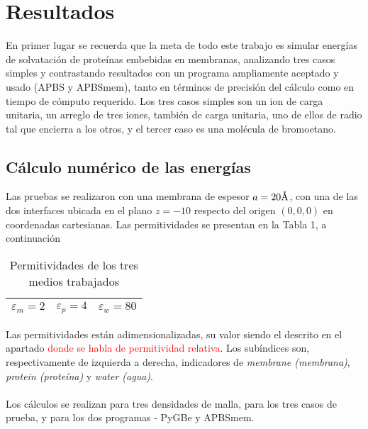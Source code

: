 \documentclass[12pt, oneside, numbers, spanish]{ezthesis}
\numberwithin{equation}{section}
\newcommand{\angstrom}{\text{\normalfont\AA}}
\begin{document}
%














\chapter{Resultados}
En primer lugar se recuerda que la meta de todo este trabajo es simular energías de solvatación de proteínas embebidas en membranas, analizando tres casos simples y contrastando resultados con un programa ampliamente aceptado y usado (APBS y APBSmem), tanto en términos de precisión del cálculo como en tiempo de cómputo requerido. Los tres casos simples son un ion de carga unitaria, un arreglo de tres iones, también de carga unitaria, uno de ellos de radio tal que encierra a los otros, y el tercer caso es una molécula de bromoetano.
\section{Cálculo numérico de las energías}
Las pruebas se realizaron con una membrana de espesor $a = 20 \angstrom$, con una de las dos interfaces ubicada en el plano $z=-10$ respecto del origen $(0,0,0)$ en coordenadas cartesianas. Las permitividades se presentan en la Tabla 1, a continuación
\begin{table}[H]
\setlength{\tabcolsep}{32pt}
\centering
\caption{Permitividades de los tres medios trabajados}
\begin{tabular}{ccc}\hline
$\varepsilon_m = 2$ & $\varepsilon_p = 4$ & $\varepsilon_w = 80$\\\hline
\end{tabular}
\end{table}
Las permitividades están adimensionalizadas, su valor siendo el descrito en el apartado \textcolor{red}{donde se habla de permitividad relativa}. Los subíndices son, respectivamente de izquierda a derecha, indicadores de \textit{membrane (membrana)}, \textit{protein (proteína)} y \textit{water (agua)}.\\\\
Los cálculos se realizan para tres densidades de malla, para los tres casos de prueba, y para los dos programas - PyGBe y APBSmem.
\end{document}
